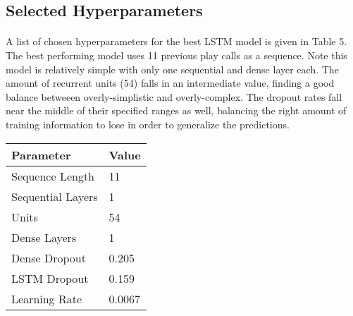 \documentclass[11pt]{article}
\begin{document}
\begin{multicols*}{2}
        
        \subsection{Selected Hyperparameters}

            \paragraph{}
                A list of chosen hyperparameters for the best LSTM model is given in Table 5. 
                The best performing model uses 11 previous play calls as a sequence. 
                Note this model is relatively simple with only one sequential and dense layer each.
                The amount of recurrent units (54) falls in an intermediate value, finding a good balance betweeen overly-simplistic and overly-complex. 
                The dropout rates fall near the middle of their specified ranges as well, balancing the right amount of training information to lose in order to generalize the predictions.
                
        
        \begin{center}
        \begin{tabular}{|| m{3cm} | m{3cm}||}
            \hline
            \textbf{Parameter} & \textbf{Value}  \\
            \hline\hline
            Sequence Length & 11  \\
            \hline
            Sequential Layers & 1 \\
            \hline
            Units & 54 \\
            \hline
            Dense Layers & 1 \\
            \hline
            Dense Dropout & 0.205 \\
            \hline
            LSTM Dropout & 0.159 \\
            \hline
            Learning Rate & 0.0067\\
            \hline 
        \end{tabular}
        \end{center}


\end{multicols*}
\end{document}
